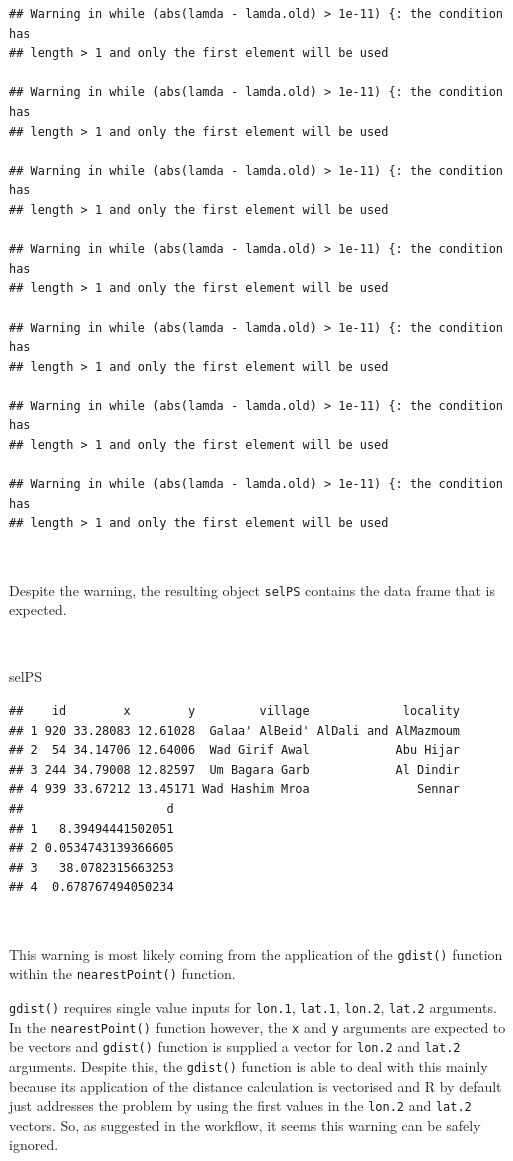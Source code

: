 \documentclass[11pt,a4paper]{article}
\newenvironment{Shaded}{}{}
\newcommand{\NormalTok}[1]{#1}
\begin{document}
\begin{verbatim}
## Warning in while (abs(lamda - lamda.old) > 1e-11) {: the condition has
## length > 1 and only the first element will be used

## Warning in while (abs(lamda - lamda.old) > 1e-11) {: the condition has
## length > 1 and only the first element will be used

## Warning in while (abs(lamda - lamda.old) > 1e-11) {: the condition has
## length > 1 and only the first element will be used

## Warning in while (abs(lamda - lamda.old) > 1e-11) {: the condition has
## length > 1 and only the first element will be used

## Warning in while (abs(lamda - lamda.old) > 1e-11) {: the condition has
## length > 1 and only the first element will be used

## Warning in while (abs(lamda - lamda.old) > 1e-11) {: the condition has
## length > 1 and only the first element will be used

## Warning in while (abs(lamda - lamda.old) > 1e-11) {: the condition has
## length > 1 and only the first element will be used
\end{verbatim}

~

Despite the warning, the resulting object \texttt{selPS} contains the
data frame that is expected.

~

\begin{Shaded}
\begin{Highlighting}[]
\NormalTok{selPS}
\end{Highlighting}
\end{Shaded}

\begin{verbatim}
##    id        x        y         village             locality
## 1 920 33.28083 12.61028  Galaa' AlBeid' AlDali and AlMazmoum
## 2  54 34.14706 12.64006  Wad Girif Awal            Abu Hijar
## 3 244 34.79008 12.82597  Um Bagara Garb            Al Dindir
## 4 939 33.67212 13.45171 Wad Hashim Mroa               Sennar
##                    d
## 1   8.39494441502051
## 2 0.0534743139366605
## 3   38.0782315663253
## 4  0.678767494050234
\end{verbatim}

~

This warning is most likely coming from the application of the
\texttt{gdist()} function within the \texttt{nearestPoint()} function.

\texttt{gdist()} requires single value inputs for \texttt{lon.1},
\texttt{lat.1}, \texttt{lon.2}, \texttt{lat.2} arguments. In the
\texttt{nearestPoint()} function however, the \texttt{x} and \texttt{y}
arguments are expected to be vectors and \texttt{gdist()} function is
supplied a vector for \texttt{lon.2} and \texttt{lat.2} arguments.
Despite this, the \texttt{gdist()} function is able to deal with this
mainly because its application of the distance calculation is vectorised
and R by default just addresses the problem by using the first values in
the \texttt{lon.2} and \texttt{lat.2} vectors. So, as suggested in the
workflow, it seems this warning can be safely ignored.
\end{document}
